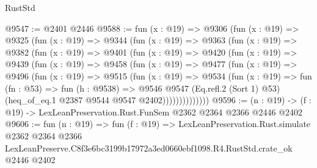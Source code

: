 \begin{lexlean}{RustStd}
\begin{coremodule}
@9547 := @2401 @2446
@9588 := fun (x : @19) =>
  @9306
    (fun (x : @19) =>
    @9325
      (fun (x : @19) =>
      @9344
        (fun (x : @19) =>
        @9363
          (fun (x : @19) =>
          @9382
            (fun (x : @19) =>
            @9401
              (fun (x : @19) =>
              @9420
                (fun (x : @19) =>
                @9439
                  (fun (x : @19) =>
                  @9458
                    (fun (x : @19) =>
                    @9477
                      (fun (x : @19) =>
                      @9496
                        (fun (x : @19) =>
                        @9515
                          (fun (x : @19) =>
                          @9534
                            (fun (x : @19) =>
                            fun (fn : @53) =>
                            fun (h : @9538) =>
                            @9546
                              @9547
                              (Eq.refl.{2} (Sort 1) @53)
                              (heq_of_eq.{1} @2387 @9544 @9547 @2402))))))))))))))
@9596 := (n : @19) -> (f : @19) -> LexLeanPreservation.Rust.FunSem @2362 @2364 @2366 @2446 @2402
@9606 := fun (n : @19) =>
  fun (f : @19) =>
  LexLeanPreservation.Rust.simulate
    @2362
    @2364
    @2366
    LexLeanPreserve.C8f3e6bc3199b17972a3ed0660ebf1098.R4.RustStd.crate_ok
    @2446
    @2402
\end{coremodule}
\end{lexlean}
